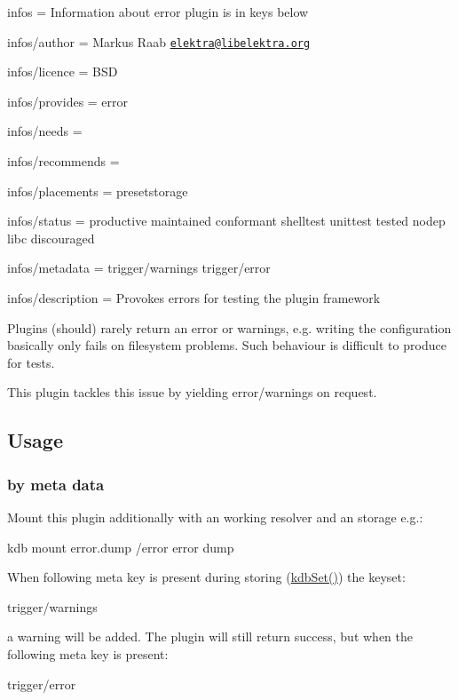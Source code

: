 
\begin{DoxyItemize}
\item infos = Information about error plugin is in keys below
\item infos/author = Markus Raab \href{mailto:elektra@libelektra.org}{\tt elektra@libelektra.\+org}
\item infos/licence = B\+S\+D
\item infos/provides = error
\item infos/needs =
\item infos/recommends =
\item infos/placements = presetstorage
\item infos/status = productive maintained conformant shelltest unittest tested nodep libc discouraged
\item infos/metadata = trigger/warnings trigger/error
\item infos/description = Provokes errors for testing the plugin framework
\end{DoxyItemize}

Plugins (should) rarely return an error or warnings, e.\+g. writing the configuration basically only fails on filesystem problems. Such behaviour is difficult to produce for tests.

This plugin tackles this issue by yielding error/warnings on request.

\subsection*{Usage}

\subsubsection*{by meta data}

Mount this plugin additionally with an working resolver and an storage e.\+g.\+: \begin{DoxyVerb}    kdb mount error.dump /error error dump
\end{DoxyVerb}


When following meta key is present during storing (\hyperlink{group__kdb_ga11436b058408f83d303ca5e996832bcf}{kdb\+Set()}) the keyset\+: \begin{DoxyVerb}    trigger/warnings
\end{DoxyVerb}


a warning will be added. The plugin will still return success, but when the following meta key is present\+: \begin{DoxyVerb}    trigger/error
\end{DoxyVerb}


